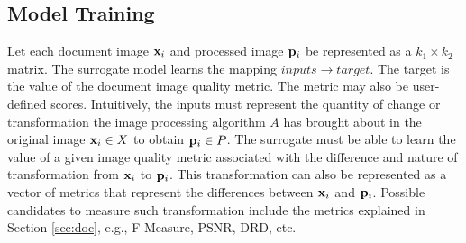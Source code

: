 \documentclass[10pt, a4paper, conference, compsocconf]{IEEEtran}
\begin{document}

\subsection{Model Training}
\label{approachB}
Let each document image ${\bf x}_i$ and processed image ${\bf p}_i$ be represented as a $k_1 \times k_2$ matrix. The surrogate model learns the mapping $inputs \rightarrow target$. The target is the value of the document image quality metric. The metric may also be user-defined scores. Intuitively, the inputs must represent the quantity of change or transformation the image processing algorithm $A$ has brought about in the original image ${\bf x}_i \in X$ to obtain ${\bf p}_i \in P$.
The surrogate must be able to learn the value of a given image quality metric associated with the difference and nature of transformation from ${\bf x}_i$ to ${\bf p}_i$. This transformation can also be represented as a vector of metrics that represent the differences between ${\bf x}_i$ and ${\bf p}_i$. Possible candidates to measure such transformation include the metrics explained in Section \ref{sec:doc}, e.g., F-Measure, PSNR, DRD, etc.
\end{document}

